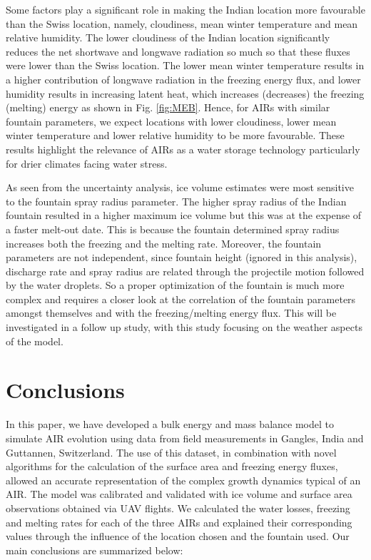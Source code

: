 \documentclass[utf8]{frontiersSCNS}
\begin{document}
Some factors play a significant role in making the Indian location more favourable than the Swiss location,
namely, cloudiness, mean winter temperature and mean relative humidity. The lower cloudiness of the Indian
location significantly reduces the net shortwave and longwave radiation so much so that these fluxes were
lower than the Swiss location. The lower mean winter temperature results in a higher contribution of longwave
radiation in the freezing energy flux, and lower humidity results in increasing latent heat, which increases
(decreases) the freezing (melting) energy as shown in Fig. \ref{fig:MEB}. Hence, for AIRs with similar
fountain parameters, we expect locations with lower cloudiness, lower mean winter temperature and lower relative
humidity to be more favourable. These results highlight the relevance of AIRs as a water storage technology
particularly for drier climates facing water stress.

As seen from the uncertainty analysis, ice volume estimates were most sensitive to the fountain spray radius
parameter. The higher spray radius of the Indian fountain resulted in a higher maximum ice volume but this was
at the expense of a faster melt-out date. This is because the fountain determined spray radius increases both
the freezing and the melting rate. Moreover, the fountain parameters are not independent, since fountain height
(ignored in this analysis), discharge rate and spray radius are related through the projectile motion followed
by the water droplets. So a proper optimization of the fountain is much more complex and requires a closer look
at the correlation of the fountain parameters amongst themselves and with the freezing/melting energy flux. This
will be investigated in a follow up study, with this study focusing on the weather aspects of the model.

\section{Conclusions}

In this paper, we have developed a bulk energy and mass balance model to simulate AIR evolution using data from
field measurements in Gangles, India and Guttannen, Switzerland. The use of this dataset, in combination with
novel algorithms for the calculation of the surface area and freezing energy fluxes, allowed an accurate
representation of the complex growth dynamics typical of an AIR. The model was calibrated and validated with ice
volume and surface area observations obtained via UAV flights. We calculated the water losses, freezing and
melting rates for each of the three AIRs and explained their corresponding values through the influence of the
location chosen and the fountain used. Our main conclusions are summarized below:
\end{document}
